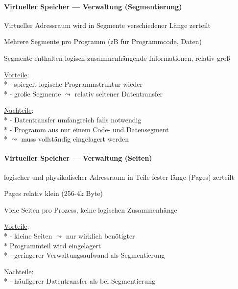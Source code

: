 \paragraph{Virtueller Speicher --- Verwaltung (Segmentierung)}
\begin{items}
  \item Virtueller Adressraum wird in Segmente verschiedener Länge zerteilt
  \item Mehrere Segmente pro Programm (zB für Programmcode, Daten)
  \item Segmente enthalten logisch zusammenhängende Informationen, relativ groß
  \item \underline{Vorteile}: \\*
    - spiegelt logische Programmstruktur wieder \\*
    - große Segmente \( \leadsto \) relativ seltener Datentransfer
  \item \underline{Nachteile}: \\*
    - Datentransfer umfangreich falls notwendig \\*
    - Programm aus nur einem Code- und Datensegment \\* \phantom{-} \( \leadsto \) muss vollständig eingelagert werden
\end{items}

\paragraph{Virtueller Speicher --- Verwaltung (Seiten)}
\begin{items}
  \item logischer und physikalischer Adressraum in Teile fester länge (Pages) zerteilt
  \item Pages relativ klein (256-4k Byte)
  \item Viele Seiten pro Prozess, keine logischen Zusammenhänge
  \item \underline{Vorteile}: \\*
    - kleine Seiten \( \leadsto \) nur wirklich benötigter \\* \phantom{-} Programmteil wird eingelagert \\*
    - geringerer Verwaltungsaufwand als Segmentierung
  \item \underline{Nachteile}: \\*
    - häufigerer Datentransfer als bei Segmentierung
\end{items}

